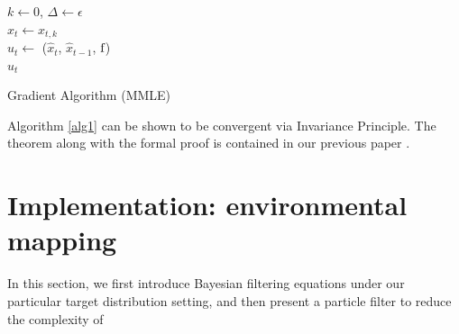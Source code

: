 \documentclass[letterpaper, 10 pt, conference]{ieeeconf}
\newcommand{\Ram}[1]{{\normalsize{\textbf{({\color{green}Ram:\ }#1)}}}}
\newcommand{\HJ}[1]{{\color{black}{#1}}}
\begin{document}
{\tiny{
		\begin{algorithm}
			\DontPrintSemicolon
			$k \gets 0$, $\Delta \gets \epsilon$\\
$\hat{x}_t \gets x_{t,k}$ \\
$\hat{u}_{t}\gets$ ($\hat{x}_{t}$, $\hat{x}_{t-1}$, $\textup{f}$) \\
\Return $\hat{u}_t$
			\caption{Gradient Algorithm (MMLE)}\label{alg1}
		\end{algorithm}
}}
Algorithm \ref{alg1} can be shown to be convergent via Invariance Principle. The theorem along with the formal proof is contained in our previous paper \cite{park2014robust}.

\section{Implementation: environmental mapping}
\label{sec:sec6}
In this section, we first introduce Bayesian filtering equations under our particular target distribution setting, and then present a particle filter to reduce the complexity of \HJ{the map construction process.} 
\end{document}
